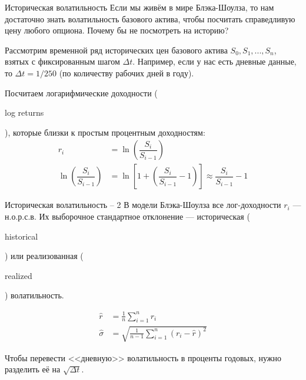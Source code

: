 \documentclass{beamer}
\newcommand{\en}[1]{\begin{otherlanguage}{english}#1\end{otherlanguage}}
\begin{document}
\begin{frame}{Историческая волатильность}
\justify
Если мы живём в мире Блэка-Шоулза, то нам достаточно знать волатильность базового актива, чтобы посчитать справедливую цену любого опциона. Почему бы не посмотреть на историю?

\justify
Рассмотрим временной ряд исторических цен базового актива $S_0,S_1,...,S_n$, взятых с фиксированным шагом $\Delta t$. Например, если у нас есть дневные данные, то $\Delta t = 1/250$ (по количеству рабочих дней в году). 

\justify
Посчитаем логарифмические доходности (\en{log returns}), которые близки к простым процентным доходностям:
\begin{align*}
r_i &= \ln \left( \dfrac{S_{i}}{S_{i-1}} \right) \\
\ln \left(\dfrac{S_{i}}{S_{i-1}} \right) &= \ln \left[1 + \left(\dfrac{S_{i}}{S_{i-1}} - 1 \right) \right] \approx \dfrac{S_{i}}{S_{i-1}} - 1
\end{align*}
\end{frame}



\begin{frame}{Историческая волатильность -- 2}
\justify
В модели Блэка-Шоулза все лог-доходности $r_i$ --- н.о.р.с.в. Их выборочное стандартное отклонение --- \alert{историческая} (\en{historical}) или \alert{реализованная} (\en{realized}) волатильность.

\begin{align*}
\hat{r} &= \frac{1}{n}\sum\limits_{i=1}^{n}r_i \\
\hat{\sigma} &= \sqrt{\frac{1}{n-1}\sum\limits_{i=1}^{n}(r_i - \hat{r})^2}
\end{align*}

\justify
Чтобы перевести <<дневную>> волатильность в проценты годовых, нужно разделить её на $\sqrt{\Delta t}$.
\end{frame}
\end{document}
